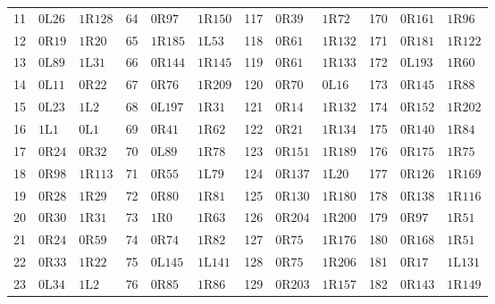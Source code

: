 \begin{longtable}{@{}rll@{\quad}rll@{\quad}rll@{\quad}rll@{}}
11 & $0\mathrm{L}26$ & $1\mathrm{R}128$ & 64 & $0\mathrm{R}97$ & $1\mathrm{R}150$ & 117 & $0\mathrm{R}39$ & $1\mathrm{R}72$ & 170 & $0\mathrm{R}161$ & $1\mathrm{R}96$\\
12 & $0\mathrm{R}19$ & $1\mathrm{R}20$ & 65 & $1\mathrm{R}185$ & $1\mathrm{L}53$ & 118 & $0\mathrm{R}61$ & $1\mathrm{R}132$ & 171 & $0\mathrm{R}181$ & $1\mathrm{R}122$\\
13 & $0\mathrm{L}89$ & $1\mathrm{L}31$ & 66 & $0\mathrm{R}144$ & $1\mathrm{R}145$ & 119 & $0\mathrm{R}61$ & $1\mathrm{R}133$ & 172 & $0\mathrm{L}193$ & $1\mathrm{R}60$\\
14 & $0\mathrm{L}11$ & $0\mathrm{R}22$ & 67 & $0\mathrm{R}76$ & $1\mathrm{R}209$ & 120 & $0\mathrm{R}70$ & $0\mathrm{L}16$ & 173 & $0\mathrm{R}145$ & $1\mathrm{R}88$\\
15 & $0\mathrm{L}23$ & $1\mathrm{L}2$ & 68 & $0\mathrm{L}197$ & $1\mathrm{R}31$ & 121 & $0\mathrm{R}14$ & $1\mathrm{R}132$ & 174 & $0\mathrm{R}152$ & $1\mathrm{R}202$\\
16 & $1\mathrm{L}1$ & $0\mathrm{L}1$ & 69 & $0\mathrm{R}41$ & $1\mathrm{R}62$ & 122 & $0\mathrm{R}21$ & $1\mathrm{R}134$ & 175 & $0\mathrm{R}140$ & $1\mathrm{R}84$\\
17 & $0\mathrm{R}24$ & $0\mathrm{R}32$ & 70 & $0\mathrm{L}89$ & $1\mathrm{R}78$ & 123 & $0\mathrm{R}151$ & $1\mathrm{R}189$ & 176 & $0\mathrm{R}175$ & $1\mathrm{R}75$\\
18 & $0\mathrm{R}98$ & $1\mathrm{R}113$ & 71 & $0\mathrm{R}55$ & $1\mathrm{L}79$ & 124 & $0\mathrm{R}137$ & $1\mathrm{L}20$ & 177 & $0\mathrm{R}126$ & $1\mathrm{R}169$\\
19 & $0\mathrm{R}28$ & $1\mathrm{R}29$ & 72 & $0\mathrm{R}80$ & $1\mathrm{R}81$ & 125 & $0\mathrm{R}130$ & $1\mathrm{R}180$ & 178 & $0\mathrm{R}138$ & $1\mathrm{R}116$\\
20 & $0\mathrm{R}30$ & $1\mathrm{R}31$ & 73 & $1\mathrm{R}0$ & $1\mathrm{R}63$ & 126 & $0\mathrm{R}204$ & $1\mathrm{R}200$ & 179 & $0\mathrm{R}97$ & $1\mathrm{R}51$\\
21 & $0\mathrm{R}24$ & $0\mathrm{R}59$ & 74 & $0\mathrm{R}74$ & $1\mathrm{R}82$ & 127 & $0\mathrm{R}75$ & $1\mathrm{R}176$ & 180 & $0\mathrm{R}168$ & $1\mathrm{R}51$\\
22 & $0\mathrm{R}33$ & $1\mathrm{R}22$ & 75 & $0\mathrm{L}145$ & $1\mathrm{L}141$ & 128 & $0\mathrm{R}75$ & $1\mathrm{R}206$ & 181 & $0\mathrm{R}17$ & $1\mathrm{L}131$\\
23 & $0\mathrm{L}34$ & $1\mathrm{L}2$ & 76 & $0\mathrm{R}85$ & $1\mathrm{R}86$ & 129 & $0\mathrm{R}203$ & $1\mathrm{R}157$ & 182 & $0\mathrm{R}143$ & $1\mathrm{R}149$\\

\end{longtable}
